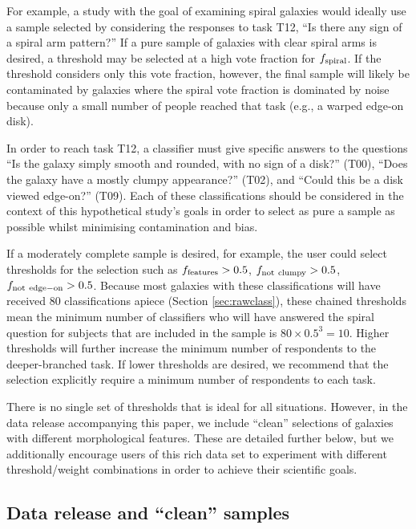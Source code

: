 \documentclass[useAMS,usenatbib]{mn2e}
\begin{document}
{For example, a study with the goal of examining spiral galaxies would ideally use a sample selected by considering the responses to task T12, ``Is there any sign of a spiral arm pattern?'' If a pure sample of galaxies with clear spiral arms is desired, a threshold may be selected at a high vote fraction for $f_{\rm spiral}$. If the threshold considers only this vote fraction, however, the final sample will likely be contaminated by galaxies where the spiral vote fraction is dominated by noise because only a small number of people reached that task (e.g., a warped edge-on disk). 

In order to reach task T12, a classifier must give specific answers to the questions ``Is the galaxy simply smooth and rounded, with no sign of a disk?'' (T00), ``Does the galaxy have a mostly clumpy appearance?'' (T02), and ``Could this be a disk viewed edge-on?'' (T09). Each of these classifications should be considered in the context of this hypothetical study's goals in order to select as pure a sample as possible whilst minimising contamination and bias.

If a moderately complete sample is desired, for example, the user could select thresholds for the selection such as $f_{\rm features} > 0.5$, $f_{\rm not\ clumpy} > 0.5$, $f_{\rm not\ edge-on} > 0.5$. Because most galaxies with these classifications will have received 80 classifications apiece (Section \ref{sec:rawclass}), these chained thresholds mean the minimum number of classifiers who will have answered the spiral question for subjects that are included in the sample is $80 \times 0.5^3 = 10$. Higher thresholds will further increase the minimum number of respondents to the deeper-branched task. If lower thresholds are desired, we recommend that the selection explicitly require a minimum number of respondents to each task. 

There is no single set of thresholds that is ideal for all situations. However, in the data release accompanying this paper, we include ``clean'' selections of galaxies with different morphological features. These are detailed further below, but we additionally encourage users of this rich data set to experiment with different threshold/weight combinations in order to achieve their scientific goals.

\subsection{Data release and ``clean'' samples}\label{sec:release}

}
\end{document}
